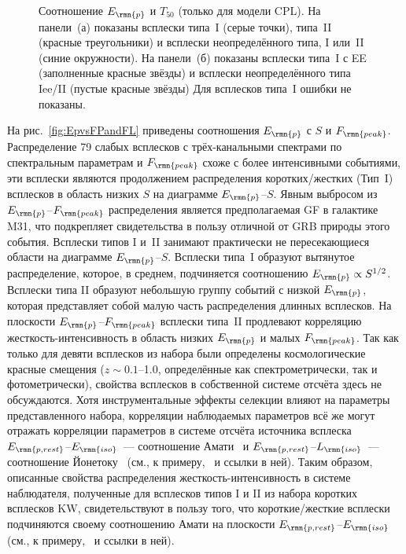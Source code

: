 \begin{figure}
    \begin{minipage}[h]{0.5\textwidth}
    \end{minipage}
    \hfill
    \begin{minipage}[h]{0.5\textwidth}
	\end{minipage}

\caption{
    Соотношение $E_\rmn{p}$ и $T_{50}$ (только для модели CPL).
    На панели~(а) показаны всплески типа~I (серые точки), типа~II (красные треугольники)
    и всплески неопределённого типа, I или~II (синие окружности).
    На панели~(б) показаны всплески типа~I с EE (заполненные красные звёзды)
    и всплески неопределённого типа Iee/II (пустые красные звёзды)
    Для всплесков типа~I ошибки не показаны. 
    \label{fig:EpT50}}
\end{figure}

На рис.~\ref{fig:EpvsFPandFL} приведены соотношения $E_\rmn{p}$ с $S$ и $F_\rmn{peak}$.
Распределение 79 слабых всплесков с трёх-канальными спектрами по спектральным параметрам 
и $F_\rmn{peak}$ схоже с более интенсивными событиями, эти всплески являются продолжением
распределения коротких/жестких (Тип~I) всплесков в область низких $S$  на диаграмме $E_\rmn{p}$--$S$.
Явным выбросом из  $E_\rmn{p}$--$F_\rmn{peak}$ распределения является предполагаемая 
GF в галактике M31, что подкрепляет свидетельства в пользу отличной от GRB природы этого события.
Всплески типов I и~II занимают практически не пересекающиеся области на диаграмме $E_\rmn{p}$--$S$.
Всплески типа~I образуют вытянутое распределение, которое, в среднем, подчиняется 
соотношению $E_\rmn{p} \propto S^{1/2}$. Всплески типа II образуют небольшую группу событий
с низкой $E_\rmn{p}$, которая представляет собой малую часть распределения длинных всплесков.
На плоскости $E_\rmn{p}$--$F_\rmn{peak}$ всплески типа~II продлевают корреляцию 
жесткость-интенсивность в область низких $E_\rmn{p}$ и малых $F_\rmn{peak}$.
Так как только для девяти всплесков из набора были определены космологические 
красные смещения ($z\sim 0.1$--1.0, определённые как спектрометрически, так и
фотометрически), свойства всплесков в собственной системе отсчёта здесь не обсуждаются.
Хотя инструментальные эффекты селекции влияют на параметры представленного набора,
корреляции наблюдаемых параметров всё же могут отражать корреляции параметров 
в системе отсчёта источника всплеска $E_\rmn{p,rest}$--$E_\rmn{iso}$~--- 
соотношение Амати~\citep{Amati_2002AandA} и $E_\rmn{p,rest}$--$L_\rmn{iso}$~--- 
соотношение Йонетоку~\citep{Yonetoku_2004ApJ}
(см., к примеру,~\citep{Nava_2008MNRAS} и ссылки в ней).
Таким образом, описанные свойства распределения жесткость-интенсивность 
в системе наблюдателя, полученные для всплесков типов I и II из набора коротких 
всплесков KW, свидетельствуют в пользу того, что короткие/жесткие всплески подчиняются 
своему соотношению Амати на плоскости $E_\rmn{p,rest}$--$E_\rmn{iso}$
(см., к примеру,~\citep{Nava_2011MNRAS} и ссылки в ней).

